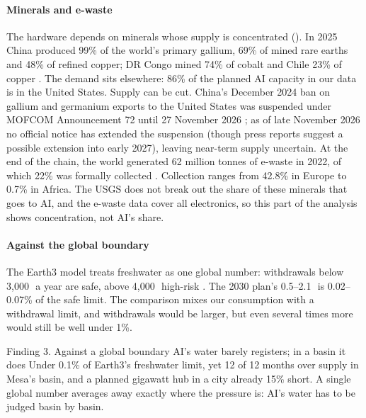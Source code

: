 \paragraph{Minerals and e-waste} The hardware depends on minerals whose supply is concentrated
(). In 2025 China produced 99\% of the world's primary gallium, 69\% of mined rare earths and 48\%
of refined copper; DR Congo mined 74\% of cobalt and Chile 23\% of copper \citep{usgs2026}. The demand sits elsewhere:
86\% of the planned AI capacity in our data is in the United States. Supply can be cut. China's December 2024 ban on
gallium and germanium exports to the United States was suspended under MOFCOM Announcement 72 until 27 November 2026
\citep{usgs2026,mofcom2025}; as of late November 2026 no official notice has extended the suspension (though press reports suggest a possible extension into early 2027), leaving near-term supply uncertain. At the end of the chain, the world
generated 62 million tonnes of e-waste in 2022, of which 22\% was formally collected \citep{balde2024}. Collection
ranges from 42.8\% in Europe to 0.7\% in Africa. The USGS does not break out the share of these minerals that goes
to AI, and the e-waste data cover all electronics, so this part of the analysis shows concentration, not AI's
share.

\paragraph{Against the global boundary} The Earth3 model treats freshwater as one global number: withdrawals below
3,000\,\kmc\ a year are safe, above 4,000\,\kmc\ high-risk \citep{collste2018}. The 2030 plan's 0.5--2.1\,\kmc\ is
0.02--0.07\% of the safe limit. The comparison mixes our consumption with a withdrawal limit, and withdrawals would be
larger, but even several times more would still be well under 1\%.

\begin{finding}{Finding 3. Against a global boundary AI's water barely registers; in a basin it does}
Under 0.1\% of Earth3's freshwater limit, yet 12 of 12 months over supply in Mesa's basin, and a planned gigawatt hub
in a city already 15\% short. A single global number averages away exactly where the pressure is: AI's water has to be
judged basin by basin.
\end{finding}
